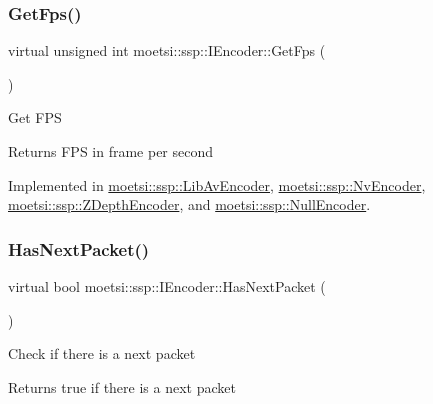 \mbox{\label{classmoetsi_1_1ssp_1_1IEncoder_ae6a865aa52230d81aed1cb5232402f6c}} 
\subsubsection{\texorpdfstring{Get\+Fps()}{GetFps()}}
{\footnotesize\ttfamily virtual unsigned int moetsi\+::ssp\+::\+I\+Encoder\+::\+Get\+Fps (\begin{DoxyParamCaption}{ }\end{DoxyParamCaption})\hspace{0.3cm}{\ttfamily [pure virtual]}}

Get F\+PS \begin{DoxyReturn}{Returns}
F\+PS in frame per second 
\end{DoxyReturn}


Implemented in \hyperlink{classmoetsi_1_1ssp_1_1LibAvEncoder_ae21f81cb967359132183a29e04307933}{moetsi\+::ssp\+::\+Lib\+Av\+Encoder}, \hyperlink{classmoetsi_1_1ssp_1_1NvEncoder_ab94b826f2aef05afad376132743001d9}{moetsi\+::ssp\+::\+Nv\+Encoder}, \hyperlink{classmoetsi_1_1ssp_1_1ZDepthEncoder_a9ea0a5783d7d265fccc3a2c262600552}{moetsi\+::ssp\+::\+Z\+Depth\+Encoder}, and \hyperlink{classmoetsi_1_1ssp_1_1NullEncoder_ad6727fa08528622081aa4eca4aacc6c1}{moetsi\+::ssp\+::\+Null\+Encoder}.

\mbox{\label{classmoetsi_1_1ssp_1_1IEncoder_a2af8e23d841ef61f6ee4037e56a3694d}} 
\subsubsection{\texorpdfstring{Has\+Next\+Packet()}{HasNextPacket()}}
{\footnotesize\ttfamily virtual bool moetsi\+::ssp\+::\+I\+Encoder\+::\+Has\+Next\+Packet (\begin{DoxyParamCaption}{ }\end{DoxyParamCaption})\hspace{0.3cm}{\ttfamily [pure virtual]}}

Check if there is a next packet \begin{DoxyReturn}{Returns}
true if there is a next packet 
\end{DoxyReturn}


